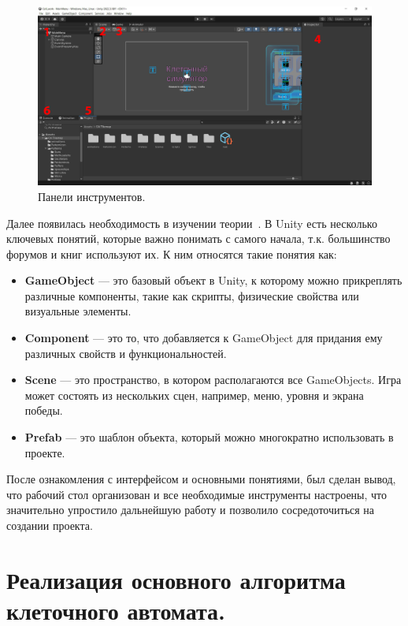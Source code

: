 \begin{figure}[H]
	\centering
	\includegraphics[width=1\textwidth]{images/Panels.png}  
	\caption{Панели инструментов.}
	\label{fig4}
\end{figure}

Далее появилась необходимость в изучении теории~\cite{OsnUnity}. В Unity есть несколько ключевых понятий, которые важно понимать с самого начала, т.к. большинство форумов и книг используют их. К ним относятся такие понятия как:
	\begin{itemize}
		\item \textbf{GameObject} --- это базовый объект в Unity, к которому можно прикреплять различные компоненты, такие как скрипты, физические свойства или визуальные элементы.
		\item \textbf{Component} --- это то, что добавляется к GameObject для придания ему различных свойств и функциональностей. 
		\item\textbf{Scene} --- это пространство, в котором располагаются все GameObjects. Игра может состоять из нескольких сцен, например, меню, уровня и экрана победы. 
		\item \textbf{Prefab} --- это шаблон объекта, который можно многократно использовать в проекте.
	\end{itemize}

После ознакомления с интерфейсом и основными понятиями, был сделан вывод, что рабочий стол организован и все необходимые инструменты настроены, что значительно упростило дальнейшую работу и позволило сосредоточиться на создании проекта.

\section{\label{sec:ch02/sec01/sub02}Реализация основного алгоритма клеточного автомата.}

